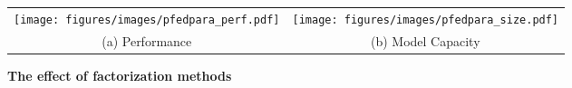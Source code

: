 \begin{wrapfigure}[8]{r}{0.45\textwidth}
\centering
\vspace{-0.35in}
\begin{tabular}{cc}
     \texttt{[image: figures/images/pfedpara\_perf.pdf]} &
     \hspace{-0.2in} \texttt{[image: figures/images/pfedpara\_size.pdf]} \\
     (a) Performance & (b) Model Capacity
\end{tabular}
\vspace{-0.1in}
\caption{\textbf{The effect of factorization methods}}
\label{fig:hadamard}
\end{wrapfigure}